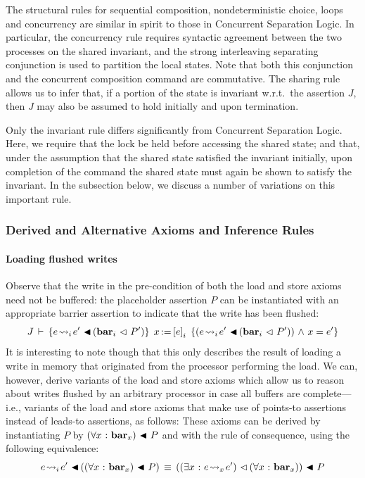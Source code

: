 \documentclass[11pt]{report}         %
\begin{document}
The structural rules for sequential composition, nondeterministic choice, loops and concurrency are similar in spirit to those in Concurrent Separation Logic. In particular, the concurrency rule requires syntactic agreement between the two processes on the shared invariant, and the strong interleaving separating conjunction is used to partition the local states. Note that both this conjunction and the concurrent composition command are commutative. The sharing rule allows us to infer that, if a portion of the state is invariant w.r.t.\ the assertion $J$, then $J$ may also be assumed to hold initially and upon termination. 

Only the invariant rule differs significantly from Concurrent Separation Logic. Here, we require that the lock be held before accessing the shared state; and that, under the assumption that the shared state satisfied the invariant initially, upon completion of the command the shared state must again be shown to satisfy the invariant. In the subsection below, we discuss a number of variations on this important rule. 

\subsubsection{Derived and Alternative Axioms and Inference Rules}

\paragraph{Loading flushed writes} Observe that the write in the pre-condition of both the load and store axioms need not be buffered: the placeholder assertion $P$ can be instantiated with an appropriate barrier assertion to indicate that the write has been flushed: \[J\,\vdash\,\left\lbrace e \!\leadsto_{i}\! e' \operatorname{\,\blacktriangleleft\,} (\mathbf{bar}_{i} \operatorname{\,\vartriangleleft\,} P') \right\rbrace\;x \operatorname{:\!=} \left[ e \right]_i\;\left\lbrace (e \!\leadsto_{i}\! e' \operatorname{\,\blacktriangleleft\,} (\mathbf{bar}_{i} \operatorname{\,\vartriangleleft\,} P')) \operatorname{\,\wedge\,} x = e' \right\rbrace\] It is interesting to note though that this only describes the result of loading a write in memory that originated from the processor performing the load. 
We can, however, derive variants of the load and store axioms which allow us to reason about writes flushed by an arbitrary processor in case all buffers are complete---i.e., variants of the load and store axioms that make use of points-to assertions instead of leads-to assertions, as follows: 
These axioms can be derived by instantiating $P$ by $(\forall x \operatorname{\,:\,} \mathbf{bar}_{x}) \operatorname{\,\blacktriangleleft\,} P$ and with the rule of consequence, using the following equivalence: \[ e \!\leadsto_{i}\! e' \operatorname{\,\blacktriangleleft\,} ((\forall x \operatorname{\,:\,} \mathbf{bar}_{x}) \operatorname{\,\blacktriangleleft\,} P) \,\equiv\, ((\exists x \operatorname{\,:\,} e \!\leadsto_{x}\! e') \operatorname{\,\vartriangleleft\,} (\forall x \operatorname{\,:\,} \mathbf{bar}_{x})) \operatorname{\,\blacktriangleleft\,} P\]
\end{document}
